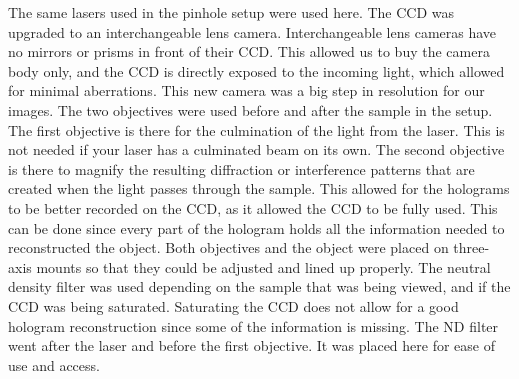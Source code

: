 The same
lasers used in the pinhole setup were used here. The CCD was upgraded to an interchangeable
lens camera. Interchangeable lens cameras have no mirrors or prisms in front of
their CCD\@. This allowed us to buy the camera body only, and the CCD is directly
exposed to the incoming light, which allowed for minimal aberrations. This new
camera was a big step in resolution for our images. The two objectives were used
before and after the sample in the setup. The first objective is there for
the culmination of the light from the laser. This is not needed if your laser
has a culminated beam on its own. The second objective is there to
magnify the resulting diffraction or interference patterns that are created
when the light passes through the sample. This allowed for the holograms to be
better recorded on the CCD, as it allowed the CCD to be fully used. This can be
done since every part of the hologram holds all the information needed to
reconstructed the object. Both objectives and the object were placed on
three-axis mounts so that they could be adjusted and lined up properly.
The neutral
density filter was used depending on the sample that was being viewed, and if the CCD was being
saturated. Saturating the CCD does not allow for a good hologram reconstruction
since some of the information is missing. The ND filter went after the laser
and before the first objective. It was placed here for ease of use and access.


 
